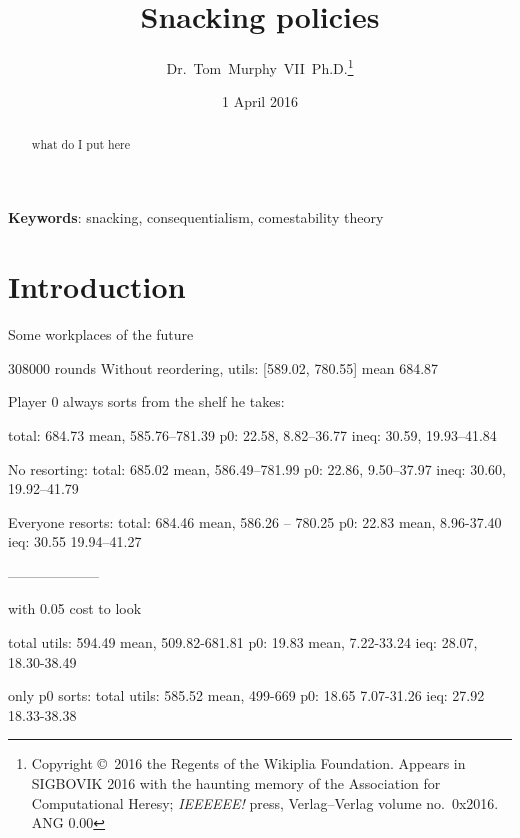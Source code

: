 \documentclass[twocolumn]{article}
\begin{document}
 

\title{Snacking policies}
\author{Dr.~Tom~Murphy~VII~Ph.D.\thanks{
    Copyright \copyright\ 2016 the Regents of the Wikiplia Foundation.
    Appears in SIGBOVIK 2016 with the haunting memory of the
    Association for Computational Heresy; {\em IEEEEEE!} press,
    Verlag--Verlag volume no.~0x2016. ANG 0.00} }

\renewcommand\>{$>$}
\newcommand\<{$<$}

\date{1 April 2016}

\maketitle

\begin{abstract}
what do I put here
\end{abstract}

\vspace{1em}
{\noindent \small {\bf Keywords}:
  snacking, consequentialism, comestability theory
}

\section{Introduction}

Some workplaces of the future



308000 rounds
Without reordering, utils: [589.02, 780.55] mean 684.87

Player 0 always sorts from the shelf he takes:


total: 684.73 mean, 585.76--781.39
p0: 22.58, 8.82--36.77
ineq: 30.59, 19.93--41.84

No resorting:
total: 685.02 mean, 586.49--781.99
p0: 22.86, 9.50--37.97
ineq: 30.60, 19.92--41.79

Everyone resorts:
total: 684.46 mean, 586.26 -- 780.25
p0: 22.83 mean, 8.96-37.40
ieq: 30.55 19.94--41.27


--------------------

with 0.05 cost to look

total utils: 594.49 mean, 509.82-681.81
p0: 19.83 mean, 7.22-33.24
ieq: 28.07, 18.30-38.49

only p0 sorts:
total utils: 585.52 mean, 499-669
p0: 18.65 7.07-31.26
ieq: 27.92 18.33-38.38
\end{document}
